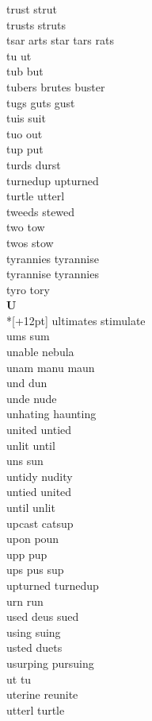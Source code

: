 trust strut\\
trusts struts\\
tsar arts star tars rats\\
tu ut\\
tub but\\
tubers brutes buster\\
tugs guts gust\\
tuis suit\\
tuo out\\
tup put\\
turds durst\\
turnedup upturned\\
turtle utterl\\
tweeds stewed\\
two tow\\
twos stow\\
tyrannies tyrannise\\
tyrannise tyrannies\\
tyro tory\\

\vspace{14pt}
\noindent\textbf{\Large U}\\*[+12pt]
ultimates stimulate\\
ums sum\\
unable nebula\\
unam manu maun\\
und dun\\
unde nude\\
unhating haunting\\
united untied\\
unlit until\\
uns sun\\
untidy nudity\\
untied united\\
until unlit\\
upcast catsup\\
upon poun\\
upp pup\\
ups pus sup\\
upturned turnedup\\
urn run\\
used deus sued\\
using suing\\
usted duets\\
usurping pursuing\\
ut tu\\
uterine reunite\\
utterl turtle\\

